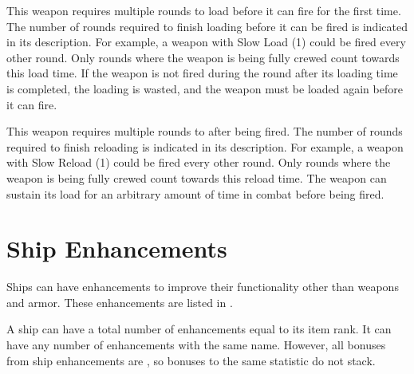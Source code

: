          This weapon requires multiple rounds to load before it can fire for the first time.
        The number of rounds required to finish loading before it can be fired is indicated in its description.
        For example, a weapon with Slow Load (1) could be fired every other round.
        Only rounds where the weapon is being fully crewed count towards this load time.
        If the weapon is not fired during the round after its loading time is completed, the loading is wasted, and the weapon must be loaded again before it can fire.

         This weapon requires multiple rounds to after being fired.
        The number of rounds required to finish reloading is indicated in its description.
        For example, a weapon with Slow Reload (1) could be fired every other round.
        Only rounds where the weapon is being fully crewed count towards this reload time.
        The weapon can sustain its load for an arbitrary amount of time in combat before being fired.

\section{Ship Enhancements}
    Ships can have enhancements to improve their functionality other than weapons and armor.
    These enhancements are listed in .

    A ship can have a total number of enhancements equal to its item rank.
    It can have any number of enhancements with the same name.
    However, all bonuses from ship enhancements are , so bonuses to the same statistic do not stack.

